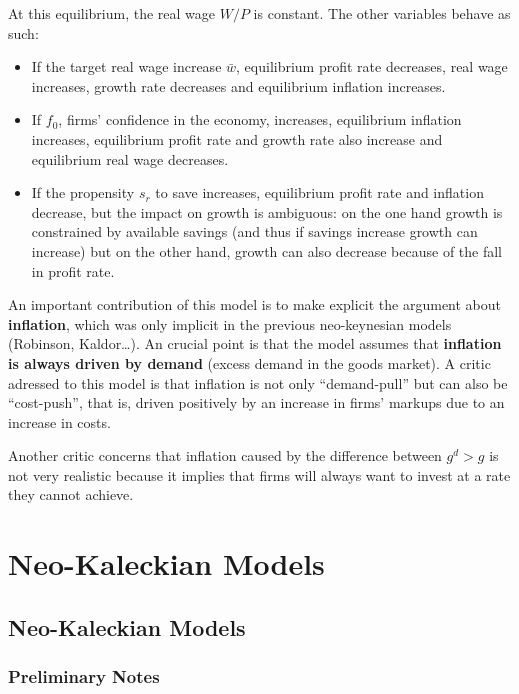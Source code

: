 \documentclass[
  letterpaper,
  DIV=11,
  numbers=noendperiod]{scrreprt}
\begin{document}
At this equilibrium, the real wage \(W/P\) is constant. The other
variables behave as such:

\begin{itemize}
\item
  If the target real wage increase \(\bar{w}\), equilibrium profit rate
  decreases, real wage increases, growth rate decreases and equilibrium
  inflation increases.
\item
  If \(f_0\), firms' confidence in the economy, increases, equilibrium
  inflation increases, equilibrium profit rate and growth rate also
  increase and equilibrium real wage decreases.
\item
  If the propensity \(s_r\) to save increases, equilibrium profit rate
  and inflation decrease, but the impact on growth is ambiguous: on the
  one hand growth is constrained by available savings (and thus if
  savings increase growth can increase) but on the other hand, growth
  can also decrease because of the fall in profit rate.
\end{itemize}

An important contribution of this model is to make explicit the argument
about \textbf{inflation}, which was only implicit in the previous
neo-keynesian models (Robinson, Kaldor\ldots). An crucial point is that
the model assumes that \textbf{inflation is always driven by demand}
(excess demand in the goods market). A critic adressed to this model is
that inflation is not only ``demand-pull'' but can also be
``cost-push'', that is, driven positively by an increase in firms'
markups due to an increase in costs.

Another critic concerns that inflation caused by the difference between
\(g^d>g\) is not very realistic because it implies that firms will
always want to invest at a rate they cannot achieve.

\part{Neo-Kaleckian Models}

\hypertarget{neo-kaleckian-models-1}{%
\chapter{Neo-Kaleckian Models}\label{neo-kaleckian-models-1}}

\hypertarget{preliminary-notes}{%
\section{Preliminary Notes}\label{preliminary-notes}}
\end{document}
